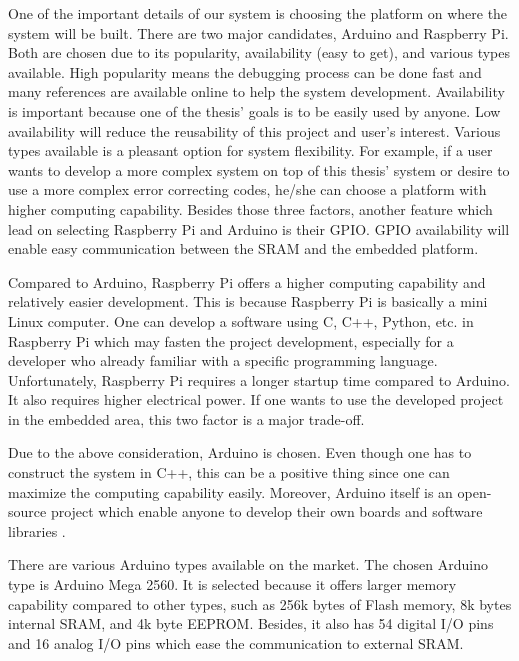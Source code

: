 One of the important details of our system is choosing the platform on where the system will be built.
There are two major candidates, Arduino and Raspberry Pi. Both are chosen due to its popularity, availability (easy to get), and various types available. High popularity means the debugging process can be done fast and many references are available online to help the system development. Availability is important because one of the thesis' goals is to be easily used by anyone. Low availability will reduce the reusability of this project and user's interest. Various types available is a pleasant option for system flexibility. For example, if a user wants to develop a more complex system on top of this thesis' system or desire to use a more complex error correcting codes, he/she can choose a platform with higher computing capability.
Besides those three factors, another feature which lead on selecting Raspberry Pi and Arduino is their GPIO. GPIO availability will enable easy communication between the SRAM and the embedded platform.

Compared to Arduino, Raspberry Pi offers a higher computing capability and relatively easier development. This is because Raspberry Pi is basically a mini Linux computer. One can develop a software using C, C++, Python, etc. in Raspberry Pi which may fasten the project development, especially for a developer who already familiar with a specific programming language. Unfortunately, Raspberry Pi requires a longer startup time compared to Arduino. It also requires higher electrical power. If one wants to use the developed project in the embedded area, this two factor is a major trade-off.

Due to the above consideration, Arduino is chosen. Even though one has to construct the system in C++, this can be a positive thing since one can maximize the computing capability easily. Moreover, Arduino itself is an open-source project which enable anyone to develop their own boards and software libraries \cite{arduino}.

There are various Arduino types available on the market. The chosen Arduino type is Arduino Mega 2560. It is selected because it offers larger memory capability compared to other types, such as 256k bytes of Flash memory, 8k bytes internal SRAM, and 4k byte EEPROM.
Besides, it also has 54 digital I/O pins and 16 analog I/O pins which ease the communication to external SRAM.

